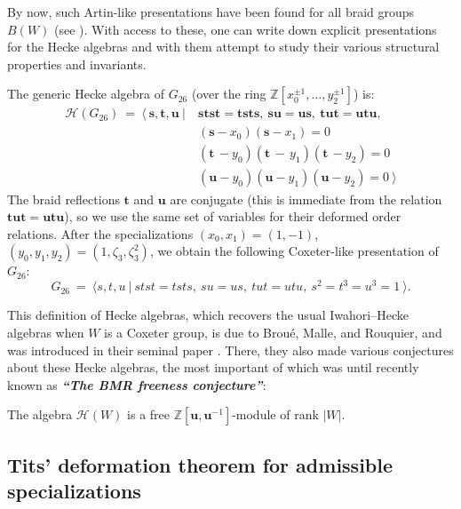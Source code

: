 \documentclass[ALCO, Unicode]{cedram}
\newcommand{\ZZ}{\mathbb{Z}}
\begin{document}
By now, such Artin-like presentations have been found for all braid groups $B(W)$ (see \cite[Appendix~A.2]{broue-book-braid-groups}). With access to these, one can write down explicit presentations for the Hecke algebras and with them attempt to study their various structural properties and invariants.

\begin{exam}\label{Example Hecke algebra of G_26}
The generic Hecke algebra of $G_{26}$ (over the ring $\ZZ[x_0^{\pm 1},\ldots, y_2^{\pm 1}]$) is:
\begin{align*}
\mathcal{H}(G_{26})\ = \ \langle\ \bm s,\bm t,\bm u\ |\ &\bm{stst}=\bm{tsts},\ \bm{su}=\bm{us},\ \bm{tut}=\bm{utu},\\
&(\bm s-x_0)(\bm s-x_1)=0\\
&(\bm t\,-y_0)(\bm t\,-\,y_1)(\bm t\,-y_2)=0\\
&(\bm u-y_0)(\bm u-y_1)(\bm u-y_2)=0\ \rangle
\end{align*}
The braid reflections $\bm t$ and $\bm u$ are conjugate (this is immediate from the relation $\bm{tut}=\bm{utu}$), so we use the same set of variables for their deformed order relations. After the specializations $(x_0,x_1)=(1,-1)$, $(y_0,y_1,y_2)=(1,\zeta_3,\zeta_3^2)$,  we obtain the following Coxeter-like presentation of $G_{26}$:$$ G_{26}\ =\ \langle s,t,u\ |\ stst=tsts,\ su=us,\ tut=utu,\ s^2=t^3=u^3=1\ \rangle.$$
\end{exam}


This definition of Hecke algebras, which recovers the usual Iwahori--Hecke algebras when $W$ is a Coxeter group, is due to Brou\'e, Malle, and Rouquier, and was introduced in their seminal paper \cite{broue-malle-rouquier-braid-hecke}. There, they also made various conjectures about these Hecke algebras, the most important of which was until recently known as \textbf{\textit{``The BMR freeness conjecture''}}:

\begin{theo*}

The algebra $\mathcal{H}(W)$ is a free $\ZZ[\bm u,\bm u^{-1}]$-module of rank $|W|$.
\end{theo*} 

\subsection{Tits' deformation theorem for admissible specializations}
\end{document}

